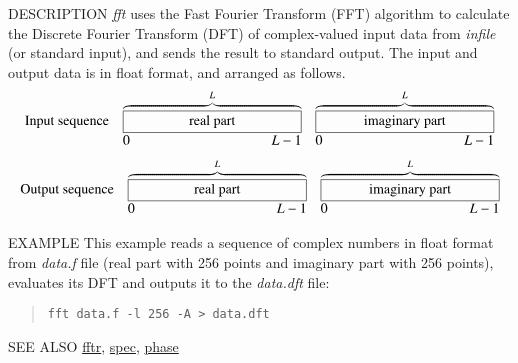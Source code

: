 \begin{synopsis}
\item[fft] [ --l $L$ ] [ --m $M$] [ --\{ A $|$ R $|$ I $|$ P \} ] 
	   [ {\em infile} ] 
\end{synopsis}

\begin{qsection}{DESCRIPTION}
{\em fft} uses the Fast Fourier Transform (FFT) algorithm 
to calculate the Discrete Fourier Transform (DFT) 
of complex-valued input data from {\em infile} (or standard input), 
and sends the result to standard output. 
The input and output data is in float format, and arranged as follows.
\[
 \begin{array}{lll}
\mbox{Input sequence} & \overbrace{\framebox[4.5cm]{real part}}^{L} &
	   \overbrace{\framebox[4.5cm]{imaginary part}}^{L} \\
		& \makebox[4.5cm]{0\hfill $L-1$} &
		\makebox[4.5cm]{0\hfill $L-1$}
\end{array}
\]
\[
\begin{array}{lll}
\mbox{Output sequence} & \overbrace{\framebox[4.5cm]{real part}}^{L} &
	   \overbrace{\framebox[4.5cm]{imaginary part}}^{L} \\
		& \makebox[4.5cm]{0\hfill $L-1$} &
		\makebox[4.5cm]{0\hfill $L-1$}
\end{array}
\]
\end{qsection}

\begin{options}
\end{options}

\begin{qsection}{EXAMPLE}
This example reads a sequence of complex numbers in float format from
{\em data.f} file (real part with 256 points and imaginary part with
256 points), evaluates its DFT and outputs it to the {\em data.dft} file:
\begin{quote}
  \verb!fft data.f -l 256 -A > data.dft!
\end{quote}
\end{qsection}

\begin{qsection}{SEE ALSO}
\hyperlink{fftr}{fftr},
\hyperlink{spec}{spec},
\hyperlink{phase}{phase}
\end{qsection}
